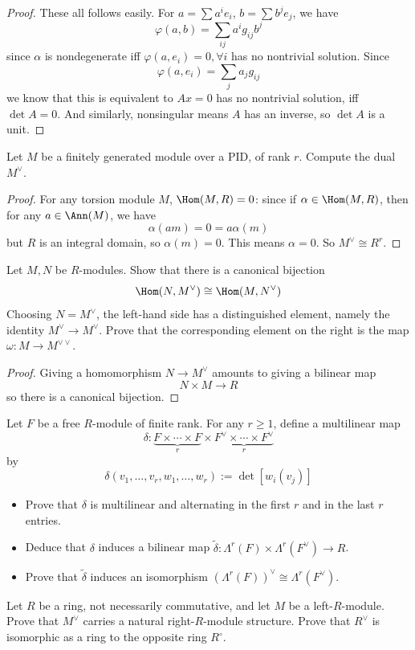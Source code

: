 \begin{proof}
These all follows easily. For $a=\sum a^ie_i$, $b=\sum b^je_j$, we have
\[\varphi(a,b)=\sum_{ij}a^ig_{ij}b^j\]
since $\alpha$ is nondegenerate iff $\varphi(a,e_i)=0,\forall i$ has no nontrivial solution. Since 
\[\varphi(a,e_i)=\sum_{j}a_jg_{ij}\]
we know that this is equivalent to $Ax=0$ has no nontrivial solution, iff $\det A=0$. And similarly, nonsingular means $A$ has an inverse, so $\det A$ is a unit.
\end{proof}
\begin{exercise}
Let $M$ be a finitely generated module over a PID, of rank $r$. Compute the dual $M^{\vee}$.
\end{exercise}
\begin{proof}
For any torsion module $M$, $\Hom(M,R)=0$: since if $\alpha\in \Hom(M,R)$, then for any $a\in\Ann(M)$, we have
\[\alpha(am)=0=a\alpha(m)\]
but $R$ is an integral domain, so $\alpha(m)=0$. This means $\alpha=0$. So $M^{\vee}\cong R^r$.
\end{proof}
\begin{exercise}
Let $M,N$ be $R$-modules. Show that there is a canonical bijection
\[\Hom(N,M^{\vee})\cong\Hom(M,N^{\vee})\]
Choosing $N=M^{\vee}$, the left-hand side has a distinguished element, namely the identity $M^{\vee}\to M^{\vee}$. Prove that the corresponding element on the right is the map $\omega:M\to M^{\vee\vee}$.
\end{exercise}
\begin{proof}
Giving a homomorphism $N\to M^{\vee}$ amounts to giving a bilinear map
\[N\times M\to R\]
so there is a canonical bijection.
\end{proof}
\begin{exercise}
Let $F$ be a free $R$-module of finite rank. For any $r\geqslant 1$, define a multilinear map
\[\delta:\underbrace{F\times\cdots\times F}_{r}\times\underbrace{F^{\vee}\times\cdots\times F^{\vee}}_{r}\]
by
\[\delta(v_1,\dots,v_r,w_1,\dots,w_r):=\det[w_i(v_j)]\]
\begin{itemize}
\item Prove that $\delta$ is multilinear and alternating in the first $r$ and in the last $r$ entries.
\item Deduce that $\delta$ induces a bilinear map $\widetilde{\delta}:\Lambda^r(F)\times\Lambda^r(F^\vee)\to R$.
\item Prove that $\widetilde{\delta}$ induces an isomorphism $(\Lambda^r(F))^\vee\cong \Lambda^r(F^\vee)$.
\end{itemize}
\end{exercise}
\begin{exercise}
Let $R$ be a ring, not necessarily commutative, and let $M$ be a left-$R$-module. Prove that $M^{\vee}$ carries a natural right-$R$-module structure. Prove that $R^{\vee}$ is isomorphic as a ring to the opposite ring $R^{\circ}$.
\end{exercise}
